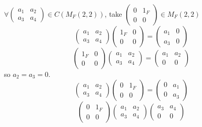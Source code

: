 \begin{answer}
\begin{enumerate}[(a)]
        $\forall \begin{pmatrix}
            a_{1}&a_{2}\\a_{3}&a_{4}
        \end{pmatrix}\in C(M_{F}(2,2))$, take $\begin{pmatrix}
            0&1_{F}\\0&0
        \end{pmatrix}\in M_{F}(2,2)$\[\begin{pmatrix}
            a_{1}&a_{2}\\a_{3}&a_{4}
        \end{pmatrix}\begin{pmatrix}
            1_{F}&0\\0&0
        \end{pmatrix}=\begin{pmatrix}
            a_{1}&0\\a_{3}&0
        \end{pmatrix}\]\[\begin{pmatrix}
            1_{F}&0\\0&0
        \end{pmatrix}\begin{pmatrix}
            a_{1}&a_{2}\\a_{3}&a_{4}
        \end{pmatrix}=\begin{pmatrix}
            a_{1}&a_{2}\\0&0
        \end{pmatrix}\] so $a_{2}=a_{3}=0$.
        \[\begin{pmatrix}
            a_{1}&a_{2}\\a_{3}&a_{4}
        \end{pmatrix}\begin{pmatrix}
            0&1_{F}\\0&0
        \end{pmatrix}=\begin{pmatrix}
            0&a_{1}\\0&a_{3}
        \end{pmatrix}\]\[\begin{pmatrix}
            0&1_{F}\\0&0
        \end{pmatrix}\begin{pmatrix}
            a_{1}&a_{2}\\a_{3}&a_{4}
        \end{pmatrix}\begin{pmatrix}
            a_{3}&a_{4}\\0&0

\end{pmatrix}\]
\end{enumerate}
\end{answer}
